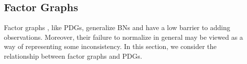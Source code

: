 \documentclass{article}
\theoremstyle{plain}
\theoremstyle{definition}
\theoremstyle{remark}
\numberwithin{equation}{section}
\begin{document}
\begin{vfull}
\subsection{Factor Graphs} 
\end{vfull}
\label{sec:factor-graphs}
	Factor graphs \cite{KF09}, like PDGs, generalize BNs and have a
        low barrier to adding observations.  Moreover, their failure to
        normalize in general may be viewed as a way of representing
        some
        inconsistency.
        In this section, we consider the relationship between factor graphs
and PDGs.        
\end{document}
